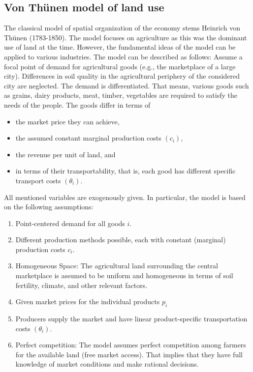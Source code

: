 \documentclass[
  12pt,
  oneside]{book}
\providecommand{\tightlist}{%
  \setlength{\itemsep}{0pt}\setlength{\parskip}{0pt}}
\theoremstyle{definition}
\theoremstyle{definition}
\theoremstyle{definition}
\theoremstyle{definition}
\theoremstyle{remark}
\begin{document}
\hypertarget{von-thuxfcnen-model-of-land-use}{%
\subsection{Von Thünen model of land use}\label{von-thuxfcnen-model-of-land-use}}

The classical model of spatial organization of the economy stems Heinrich von Thünen (1783-1850). The model focuses on agriculture as this was the dominant use of land at the time. However, the fundamental ideas of the model can be applied to various industries.
The model can be described as follows: Assume a focal point of demand for agricultural goods (e.g., the marketplace of a large city). Differences in soil quality in the agricultural periphery of the considered city are neglected. The demand is differentiated. That means, various goods such as grains, dairy products, meat, timber, vegetables are required to satisfy the needs of the people. The goods differ in terms of

\begin{itemize}
\tightlist
\item
  the market price they can achieve,
\item
  the assumed constant marginal production costs \((c_i)\),
\item
  the revenue per unit of land, and
\item
  in terms of their transportability, that is, each good has different specific transport costs \((\theta_i)\).
\end{itemize}

All mentioned variables are exogenously given. In particular, the model is based on the following assumptions:

\begin{enumerate}
\def\labelenumi{\arabic{enumi}.}
\tightlist
\item
  Point-centered demand for all goods \(i\).
\item
  Different production methods possible, each with constant (marginal) production costs \(c_i\).
\item
  Homogeneous Space: The agricultural land surrounding the central marketplace is assumed to be uniform and homogeneous in terms of soil fertility, climate, and other relevant factors.
\item
  Given market prices for the individual products \(p_i\)
\item
  Producers supply the market and have linear product-specific transportation costs \((\theta_i)\).
\item
  Perfect competition: The model assumes perfect competition among farmers for the available land (free market access). That implies that they have full knowledge of market conditions and make rational decisions.
\end{enumerate}
\end{document}
